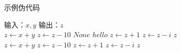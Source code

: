 \begin{algorithm}
\caption{示例伪代码}
\begin{algorithmic}[1]
\Require 输入：$x, y$
\Ensure 输出：$z$
\\
    \State $z \gets x + y$
        \State $z \gets z - 10$
        \State \Return $None$
    \Else
        \State $hello$
    \EndIf
        \State $z \gets z + 1$
    \EndWhile
        \State $z \gets z - i$
    \EndFor
    \State \Return $z$
\EndFunction
\\
    \State $z \gets x + y$
        \State $z \gets z - 10$
    \EndIf
        \State $z \gets z + 1$
    \EndWhile
        \State $z \gets z - i$
    \EndFor
    \State \Return $z$
\EndFunction
\end{algorithmic}
\end{algorithm}